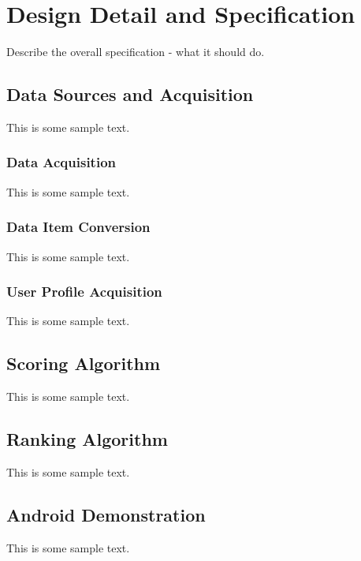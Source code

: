 \chapter{Design Detail and Specification}

Describe the overall specification - what it should do.

\section{Data Sources and Acquisition}

This is some sample text.

\subsection{Data Acquisition}

This is some sample text.

\subsection{Data Item Conversion}

This is some sample text.

\subsection{User Profile Acquisition}

This is some sample text.

\section{Scoring Algorithm}

This is some sample text.

\section{Ranking Algorithm}

This is some sample text.

\section{Android Demonstration}

This is some sample text.